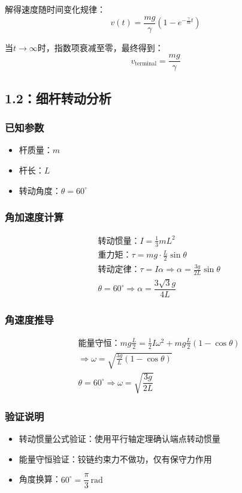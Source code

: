 \documentclass{article}
\begin{document}
解得速度随时间变化规律：
\[
v(t) = \frac{mg}{\gamma}\left(1 - e^{-\frac{\gamma}{m}t}\right)
\]

当\( t \to \infty \)时，指数项衰减至零，最终得到：
\[
\boxed{v_{\text{terminal}} = \dfrac{mg}{\gamma}}
\]

\subsection*{1.2：细杆转动分析}
\subsubsection*{已知参数}
\begin{itemize}
  \item 杆质量：\( m \)
  \item 杆长：\( L \)
  \item 转动角度：\( \theta = 60^\circ \)
\end{itemize}

\subsubsection*{角加速度计算}
\begin{align*}
  & \text{转动惯量：} I = \frac{1}{3}mL^2 \\
  & \text{重力矩：} \tau = mg\cdot\frac{L}{2}\sin\theta \\
  & \text{转动定律：} \tau = I\alpha \Rightarrow \alpha = \frac{3g}{2L}\sin\theta \\
  & \theta=60^\circ \Rightarrow \boxed{\alpha = \dfrac{3\sqrt{3}g}{4L}}
\end{align*}

\subsubsection*{角速度推导}
\begin{align*}
  & \text{能量守恒：} mg\frac{L}{2} = \frac{1}{2}I\omega^2 + mg\frac{L}{2}(1-\cos\theta) \\
  & \Rightarrow \omega = \sqrt{\frac{3g}{L}(1-\cos\theta)} \\
  & \theta=60^\circ \Rightarrow \boxed{\omega = \sqrt{\dfrac{3g}{2L}}}
\end{align*}

\subsubsection*{验证说明}
\begin{itemize}
  \item 转动惯量公式验证：使用平行轴定理确认端点转动惯量
  \item 能量守恒验证：铰链约束力不做功，仅有保守力作用
  \item 角度换算：\( 60^\circ = \dfrac{\pi}{3} \, \text{rad} \)
\end{itemize}
\end{document}
